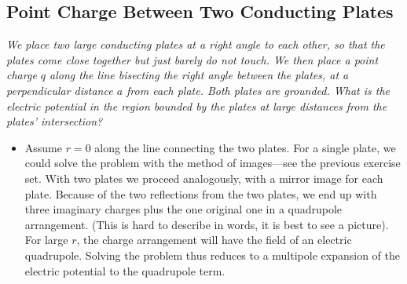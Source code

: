 \documentclass[11pt, a4paper]{article}
\begin{document}
\subsection{Point Charge Between Two Conducting Plates}
\textit{We place two large conducting plates at a right angle to each other, so that the plates come close together but just barely do not touch. We then place a point charge $ q $ along the line bisecting the right angle between the plates, at a perpendicular distance $ a $ from each plate. Both plates are grounded. What is the electric potential in the region bounded by the plates at large distances from the plates' intersection?}
\begin{itemize}
	\item Assume $ r = 0 $ along the line connecting the two plates. For a single plate, we could solve the problem with the method of images---see the previous exercise set. With two plates we proceed analogously, with a mirror image for each plate. Because of the two reflections from the two plates, we end up with three imaginary charges plus the one original one in a quadrupole arrangement. (This is hard to describe in words, it is best to see a picture). For large $ r $, the charge arrangement will have the field of an electric quadrupole. Solving the problem thus reduces to a multipole expansion of the electric potential to the quadrupole term.  
\end{itemize}	
	
\end{document}
